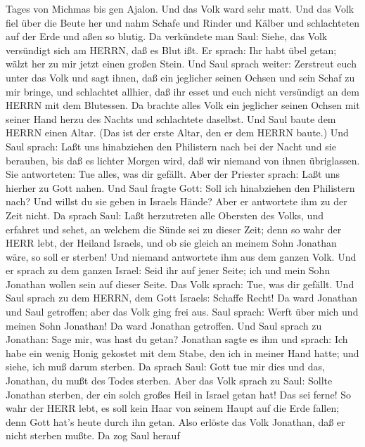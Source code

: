 Tages von Michmas bis gen Ajalon. Und das Volk ward sehr matt.
 Und das Volk fiel über die Beute her und nahm Schafe und
Rinder und Kälber und schlachteten auf der Erde und aßen so blutig.
 Da verkündete man Saul: Siehe, das Volk versündigt sich am
HERRN, daß es Blut ißt. Er sprach: Ihr habt übel getan; wälzt her zu mir
jetzt einen großen Stein.  Und Saul sprach weiter:
Zerstreut euch unter das Volk und sagt ihnen, daß ein jeglicher seinen
Ochsen und sein Schaf zu mir bringe, und schlachtet allhier, daß ihr
esset und euch nicht versündigt an dem HERRN mit dem Blutessen. Da
brachte alles Volk ein jeglicher seinen Ochsen mit seiner Hand herzu des
Nachts und schlachtete daselbst.  Und Saul baute dem HERRN
einen Altar. (Das ist der erste Altar, den er dem HERRN baute.)
 Und Saul sprach: Laßt uns hinabziehen den Philistern nach
bei der Nacht und sie berauben, bis daß es lichter Morgen wird, daß wir
niemand von ihnen übriglassen. Sie antworteten: Tue alles, was dir
gefällt. Aber der Priester sprach: Laßt uns hierher zu Gott nahen.
 Und Saul fragte Gott: Soll ich hinabziehen den Philistern
nach? Und willst du sie geben in Israels Hände? Aber er antwortete ihm
zu der Zeit nicht.  Da sprach Saul: Laßt herzutreten alle
Obersten des Volks, und erfahret und sehet, an welchem die Sünde sei zu
dieser Zeit;  denn so wahr der HERR lebt, der Heiland
Israels, und ob sie gleich an meinem Sohn Jonathan wäre, so soll er
sterben! Und niemand antwortete ihm aus dem ganzen Volk. 
Und er sprach zu dem ganzen Israel: Seid ihr auf jener Seite; ich und
mein Sohn Jonathan wollen sein auf dieser Seite. Das Volk sprach: Tue,
was dir gefällt.  Und Saul sprach zu dem HERRN, dem Gott
Israels: Schaffe Recht! Da ward Jonathan und Saul getroffen; aber das
Volk ging frei aus.  Saul sprach: Werft über mich und
meinen Sohn Jonathan! Da ward Jonathan getroffen.  Und Saul
sprach zu Jonathan: Sage mir, was hast du getan? Jonathan sagte es ihm
und sprach: Ich habe ein wenig Honig gekostet mit dem Stabe, den ich in
meiner Hand hatte; und siehe, ich muß darum sterben.  Da
sprach Saul: Gott tue mir dies und das, Jonathan, du mußt des Todes
sterben.  Aber das Volk sprach zu Saul: Sollte Jonathan
sterben, der ein solch großes Heil in Israel getan hat! Das sei ferne!
So wahr der HERR lebt, es soll kein Haar von seinem Haupt auf die Erde
fallen; denn Gott hat's heute durch ihn getan. Also erlöste das Volk
Jonathan, daß er nicht sterben mußte.  Da zog Saul herauf
